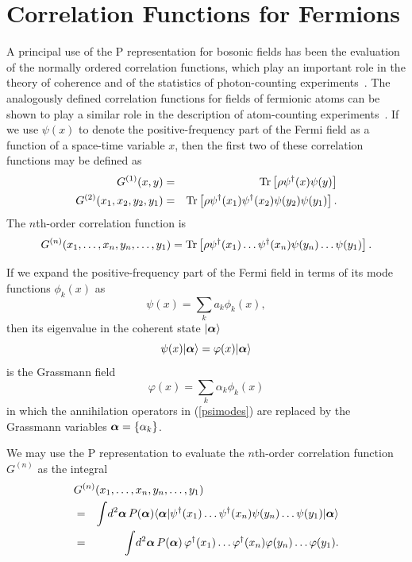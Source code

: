 \documentclass[12pt]{article}
\def\beq{\begin{equation}}
\def\eeq{\end{equation}}
\def\bea{\begin{eqnarray}}
\def\eea{\end{eqnarray}}
\def\a{\alpha}
\def\ba{{\mbox{\boldmath$\alpha$}}}
\def\dgr{\dagger}
\def\Tr{{\rm Tr}}
\def\ops{operators }
\def\ani{annihilation }
\begin{document}
\section{Correlation Functions for Fermions}
\par
A principal use of the P representation
for bosonic fields has been the evaluation
of the normally ordered correlation functions,
which play an important role in the theory
of coherence and of the statistics of photon-counting
experiments~\cite{rjg2}.
The analogously defined correlation functions
for fields of fermionic atoms can be shown to play 
a similar role in the description of atom-counting
experiments~\cite{rjg3}.
If we use $ \psi(x) $ to denote the positive-frequency part
of the Fermi field as a function of a space-time variable $x$,
then the first two of these correlation functions
may be defined as
\bea
G^{(1)} ( x , y ) & = & \Tr \left[ \rho \psi^\dgr (x) \psi(y) \right]
\label {G1}\\
G^{(2)} ( x_1 , x_2 , y_2 , y_1 ) & = & 
\Tr \left[ \rho \psi^\dgr (x_1) \psi^\dgr (x_2) 
\psi(y_2) \psi(y_1) \right] .
\label {G2}\\
\eea
The $n$th-order correlation function is
\beq
G^{(n)} ( x_1 , \dots, x_n , y_n , \dots, y_1 ) =  
\Tr \left[ \rho \psi^\dgr (x_1) \dots \psi^\dgr (x_n) 
\psi(y_n) \dots \psi(y_1) \right] .
\label {Gn}
\eeq
\par
If we expand the positive-frequency part
of the Fermi field in terms of its mode functions $ \phi_k( x ) $ as
\beq
\psi ( x ) = \sum_k a_k \phi_k( x ) ,
\label {psimodes}
\eeq
then its eigenvalue in the coherent state $ | \ba \rangle $
\beq
\psi ( x ) | \ba \rangle
= \varphi( x ) | \ba \rangle
\label {phieig}
\eeq
is the Grassmann field
\beq
\varphi ( x ) = \sum_k \a_k \phi_k( x ) 
\label {varphi}
\eeq
in which the \ani \ops in (\ref {psimodes})
are replaced by the Grassmann variables
$ \ba = \{ \a_k \}$.
\par
We may use the P representation to evaluate
the $n$th-order correlation function $ G^{(n)} $ 
as the integral 
\bea
\lefteqn{G^{(n)} ( x_1 , \dots, x_n , y_n , \dots, y_1 ) \qquad 
\qquad \qquad \qquad \qquad } \\
& = & \int \! d^2 \ba \, 
P( \ba ) \langle \ba |
\psi^\dgr (x_1) \dots \psi^\dgr (x_n)
\psi(y_n) \dots \psi(y_1) | \ba \rangle \\
& = & \int \! d^2 \ba \,
P( \ba ) \,
\varphi^\dgr (x_1) \dots \varphi^\dgr (x_n)
\varphi(y_n) \dots \varphi(y_1) .
\label {PG}
\eea
\end{document}
